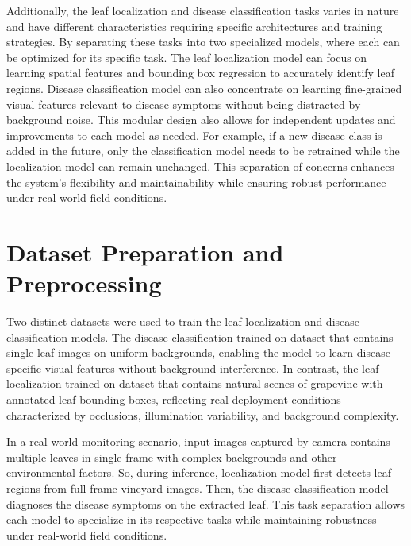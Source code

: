 Additionally, the leaf localization and disease classification tasks varies in nature and have different characteristics requiring specific architectures and training strategies. By separating these tasks into two specialized models, where each can be optimized for its specific task. The leaf localization model can focus on learning spatial features and bounding box regression to accurately identify leaf regions. Disease classification model can also concentrate on learning fine-grained visual features relevant to disease symptoms without being distracted by background noise. This modular design also allows for independent updates and improvements to each model as needed. For example, if a new disease class is added in the future, only the classification model needs to be retrained while the localization model can remain unchanged. This separation of concerns enhances the system's flexibility and maintainability while ensuring robust performance under real-world field conditions.


\section{Dataset Preparation and Preprocessing}
\label{sec:dataset}
\vspace{-1mm}
Two distinct datasets were used to train the leaf localization and disease classification models. The disease classification trained on dataset that contains single-leaf images on uniform backgrounds, enabling the model to learn disease-specific visual features without background interference. In contrast, the leaf localization trained on dataset that contains natural scenes of grapevine with annotated leaf bounding boxes, reflecting real deployment conditions characterized by occlusions, illumination variability, and background complexity.

In a real-world monitoring scenario, input images captured by camera contains multiple leaves in single frame with complex backgrounds and other environmental factors. So, during inference, localization model first detects leaf regions from full frame vineyard images. Then, the disease classification model diagnoses the disease symptoms on the extracted leaf. This task separation allows each model to specialize in its respective tasks while maintaining robustness under real-world field conditions. 

\vspace{-2mm}
